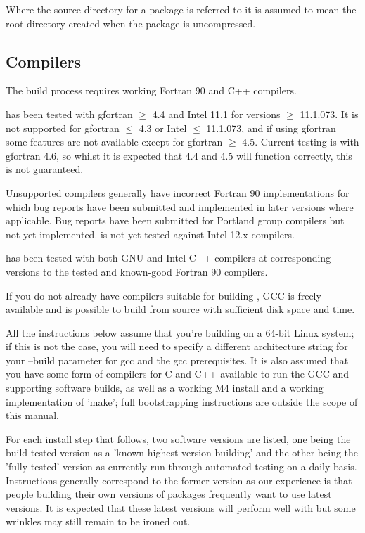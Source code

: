 Where the source directory for a package is referred to it is assumed to mean
the root directory created when the package is uncompressed.

\subsection{Compilers}
\label{sec:required_libraries_compilers}

The \fluidity build process requires working Fortran 90 and C++ compilers.

\fluidity has been tested with gfortran $\geq$ 4.4 and Intel 11.1 for versions
$\geq$ 11.1.073. It is not supported for gfortran $\leq$ 4.3 or Intel $\leq$
11.1.073, and if using gfortran some features are not available except for
gfortran $\geq$ 4.5. Current testing is with gfortran 4.6, so whilst it is
expected that 4.4 and 4.5 will function correctly, this is not guaranteed.

Unsupported compilers generally have incorrect Fortran 90 implementations for
which bug reports have been submitted and implemented in later versions where
applicable. Bug reports have been submitted for Portland group compilers but
not yet implemented. \fluidity is not yet tested against Intel 12.x compilers.

\fluidity has been tested with both GNU and Intel C++ compilers at corresponding
versions to the tested and known-good Fortran 90 compilers.

If you do not already have compilers suitable for building \fluidity, GCC is
freely available and is possible to build from source with sufficient disk
space and time.

All the instructions below assume that you're building on a 64-bit Linux
system; if this is not the case, you will need to specify a different
architecture string for your --build parameter for gcc and the gcc
prerequisites. It is also assumed that you have some form of compilers for C
and C++ available to run the GCC and supporting software builds, as well as a
working M4 install and a working implementation of 'make'; full bootstrapping
instructions are outside the scope of this manual.

For each install step that follows, two software versions are listed, one being
the build-tested version as a 'known highest version building' and the other
being the 'fully tested' version as currently run through automated testing on
a daily basis. Instructions generally correspond to the former version as our
experience is that people building their own versions of packages frequently
want to use latest versions. It is expected that these latest versions will
perform well with \fluidity but some wrinkles may still remain to be ironed
out.

